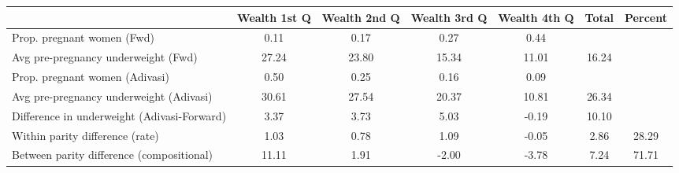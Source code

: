 \begin{tabular}{l*{6}{c}}
\toprule
            &\multicolumn{1}{c}{Wealth 1st Q}&\multicolumn{1}{c}{Wealth 2nd Q}&\multicolumn{1}{c}{Wealth 3rd Q}&\multicolumn{1}{c}{Wealth 4th Q}&\multicolumn{1}{c}{Total}&\multicolumn{1}{c}{Percent}\\
\midrule
\midrule
Prop. pregnant women (Fwd)&        0.11&        0.17&        0.27&        0.44&            &            \\
Avg pre-pregnancy underweight (Fwd)&       27.24&       23.80&       15.34&       11.01&       16.24&            \\
Prop. pregnant women (Adivasi)&        0.50&        0.25&        0.16&        0.09&            &            \\
Avg pre-pregnancy underweight (Adivasi)&       30.61&       27.54&       20.37&       10.81&       26.34&            \\
Difference in underweight (Adivasi-Forward)&        3.37&        3.73&        5.03&       -0.19&       10.10&            \\
Within parity difference (rate)&        1.03&        0.78&        1.09&       -0.05&        2.86&       28.29\\
Between parity difference (compositional)&       11.11&        1.91&       -2.00&       -3.78&        7.24&       71.71\\
\bottomrule
\end{tabular}
